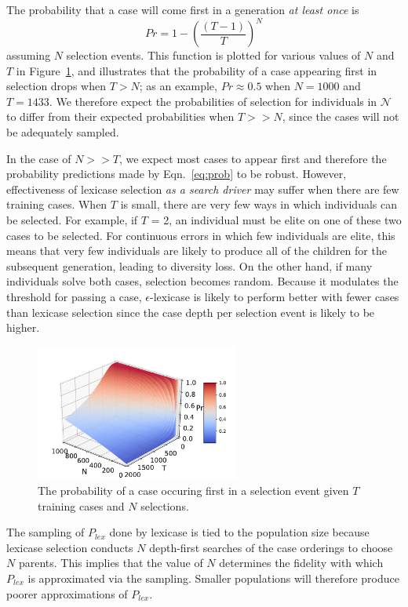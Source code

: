 \documentclass[twoside]{article}
\begin{document}
The probability that a case will come first in a generation {\it at least once} is \[Pr = 1 - \left(\frac{(T-1)}{T}\right)^N\] assuming $N$ selection events. This function is plotted for various values of $N$ and $T$ in Figure~\ref{fig:prob_first}, and illustrates that the probability of a case appearing first in selection drops when $T > N$; as an example, $Pr \approx 0.5$ when $N=1000$ and $T=1433$. We therefore expect the probabilities of selection for individuals in $\mathcal{N}$ to differ from their expected probabilities when $T >> N$, since the cases will not be adequately sampled.

In the case of $N >> T$, we expect most cases to appear first and therefore the probability predictions made by Eqn.~\ref{eq:prob} to be robust. However, effectiveness of lexicase selection {\it as a search driver} may suffer when there are few training cases. When $T$ is small, there are very few ways in which individuals can be selected. For example, if $T$ = 2, an individual must be elite on one of these two cases to be selected. For continuous errors in which few individuals are elite, this means that very few individuals are likely to produce all of the children for the subsequent generation, leading to diversity loss. On the other hand, if many individuals solve both cases, selection becomes random. Because it modulates the threshold for passing a case, $\epsilon$-lexicase is likely to perform better with fewer cases than lexicase selection since the case depth per selection event is likely to be higher.

\begin{figure}
\centering
  \includegraphics[width = 0.6\textwidth]{figs/prob_case_first.pdf}
  \caption{The probability of a case occuring first in a selection event given $T$ training cases and $N$ selections.}\label{fig:prob_first}
\end{figure}

The sampling of $P_{lex}$ done by lexicase is tied to the population size because lexicase selection conducts $N$ depth-first searches of the case orderings to choose $N$ parents. This implies that the value of $N$ determines the fidelity with which $P_{lex}$ is approximated via the sampling. Smaller populations will therefore produce poorer approximations of $P_{lex}$. 
\end{document}
